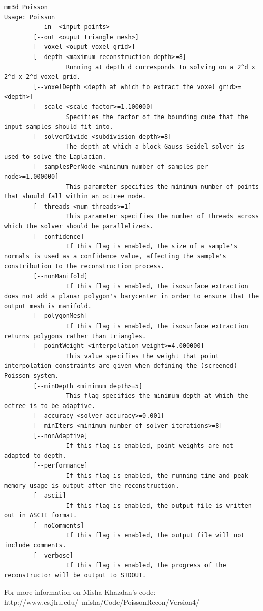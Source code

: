 \begin{verbatim}
mm3d Poisson
Usage: Poisson
         --in  <input points>
        [--out <ouput triangle mesh>]
        [--voxel <ouput voxel grid>]
        [--depth <maximum reconstruction depth>=8]
                 Running at depth d corresponds to solving on a 2^d x 2^d x 2^d voxel grid.
        [--voxelDepth <depth at which to extract the voxel grid>=<depth>]
        [--scale <scale factor>=1.100000]
                 Specifies the factor of the bounding cube that the input samples should fit into.
        [--solverDivide <subdivision depth>=8]
                 The depth at which a block Gauss-Seidel solver is used to solve the Laplacian.
        [--samplesPerNode <minimum number of samples per node>=1.000000]
                 This parameter specifies the minimum number of points that should fall within an octree node.
        [--threads <num threads>=1]
                 This parameter specifies the number of threads across which the solver should be parallelizeds.
        [--confidence]
                 If this flag is enabled, the size of a sample's normals is used as a confidence value, affecting the sample's constribution to the reconstruction process.
        [--nonManifold]
                 If this flag is enabled, the isosurface extraction does not add a planar polygon's barycenter in order to ensure that the output mesh is manifold.
        [--polygonMesh]
                 If this flag is enabled, the isosurface extraction returns polygons rather than triangles.
        [--pointWeight <interpolation weight>=4.000000]
                 This value specifies the weight that point interpolation constraints are given when defining the (screened) Poisson system.
        [--minDepth <minimum depth>=5]
                 This flag specifies the minimum depth at which the octree is to be adaptive.
        [--accuracy <solver accuracy>=0.001]
        [--minIters <minimum number of solver iterations>=8]
        [--nonAdaptive]
                 If this flag is enabled, point weights are not adapted to depth.
        [--performance]
                 If this flag is enabled, the running time and peak memory usage is output after the reconstruction.
        [--ascii]
                 If this flag is enabled, the output file is written out in ASCII format.
        [--noComments]
                 If this flag is enabled, the output file will not include comments.
        [--verbose]
                 If this flag is enabled, the progress of the reconstructor will be output to STDOUT.
\end{verbatim}
For more information on Misha Khazdan's code: http://www.cs.jhu.edu/~misha/Code/PoissonRecon/Version4/

